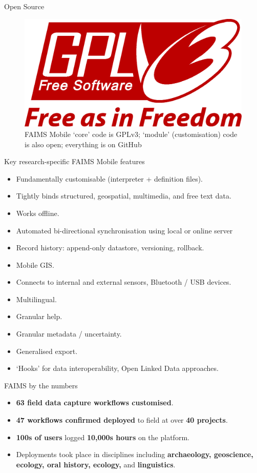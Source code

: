 \documentclass[aspectratio=169, 12pt]{beamer} %
\begin{document}
\begin{frame}{Open Source}
 \begin{figure}[H]
    \centering
        \includegraphics[width=.75\textwidth]{figures/GPLv3_Logo.eps}
        \caption{FAIMS Mobile `core' code is GPLv3; `module' (customisation) code is also open; everything is on GitHub}
        \label{fig:FAIMS-github-OSS}
 \end{figure}
\end{frame}

\begin{frame}{Key research-specific FAIMS Mobile features}
    \begin{itemize}[label=\textbullet]
        \item Fundamentally customisable (interpreter + definition files).
        \item Tightly binds structured, geospatial, multimedia, and free text data.
        \item Works offline.
        \item Automated bi-directional synchronisation using local or online server
        \item Record history: append-only datastore, versioning, rollback.
        \item Mobile GIS.
        \item Connects to internal and external sensors, Bluetooth / USB devices.
        \item Multilingual.
        \item Granular help.
        \item Granular metadata / uncertainty.
        \item Generalised export.
        \item `Hooks’ for data interoperability, Open Linked Data approaches.
    \end{itemize}
\end{frame}

\begin{frame}{FAIMS by the numbers}
 \begin{itemize}[label=\textbullet]
        \item \textbf{63 field data capture workflows customised}.
        \item \textbf{47 workflows confirmed deployed} to field at over \textbf{40 projects}.
        \item \textbf{100s of users} logged \textbf{10,000s hours} on the platform.
        \item Deployments took place in disciplines including \textbf{archaeology, geoscience, ecology, oral history, ecology, }and \textbf{linguistics}.
    \end{itemize}
\end{frame}
\end{document}
